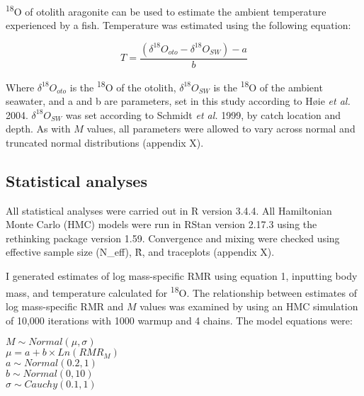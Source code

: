 \documentclass[12pt, titlepage]{article}
\begin{document}
\textdelta \textsuperscript{18}O of otolith aragonite can be used to estimate the ambient temperature experienced by a fish. %
Temperature was estimated using the following equation:

\begin{equation}
T = \frac{(\delta^{18}O_{oto} - \delta^{18}O_{SW}) - a}{b}
\end{equation}

\noindent Where $\delta^{18}O_{oto}$ is the \textdelta \textsuperscript{18}O of the otolith, $\delta^{18}O_{SW}$ is the \textdelta \textsuperscript{18}O of the ambient seawater, and a and b are parameters, set in this study according to H{\o}ie \textit{et al.} 2004. $\delta^{18}O_{SW}$  was set according to Schmidt \textit{et al.} 1999, by catch location and depth. 
As with $M$ values, all parameters were allowed to vary across normal and truncated normal distributions (appendix X). %

\subsection{Statistical analyses}

All statistical analyses were carried out in R version 3.4.4. %
All Hamiltonian Monte Carlo (HMC) models were run in RStan version 2.17.3 %
using the rethinking package version 1.59. %
Convergence and mixing were checked using effective sample size (N\_eff), \^R, and traceplots (appendix X).

I generated estimates of log mass-specific RMR using equation 1, inputting body mass, and temperature calculated for \textdelta \textsuperscript{18}O.
The relationship between estimates of log mass-specific RMR and $M$ values was examined by using an HMC simulation of 10,000 iterations with 1000 warmup %
and 4 chains.
The model equations were:

\begin{center}
$M \sim Normal(\mu, \sigma)$
\\$\mu = a + b \times Ln(RMR_{M})$
\\$a \sim Normal(0.2, 1)$
\\$b \sim Normal(0, 10)$
\\$\sigma \sim Cauchy(0.1, 1)$
\end{center}
\end{document}
